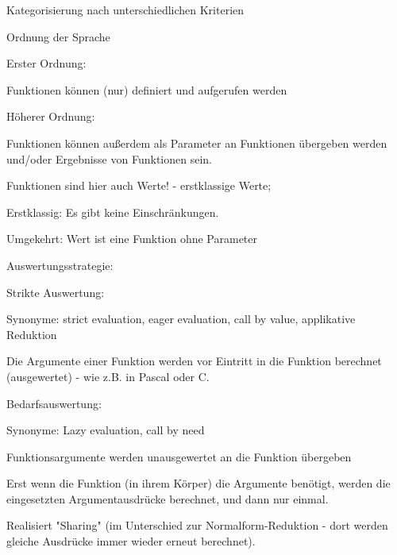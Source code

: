 \documentclass[10pt]{article}
\begin{document}
\begin{itemize*}
  \item Kategorisierung nach unterschiedlichen Kriterien
  \item Ordnung der Sprache
  \begin{itemize*}
    \item Erster Ordnung:
    \begin{itemize*}
      \item Funktionen können (nur) definiert und aufgerufen werden
    \end{itemize*}
    \item Höherer Ordnung:
    \begin{itemize*}
      \item Funktionen können außerdem als Parameter an Funktionen übergeben werden und/oder Ergebnisse von Funktionen sein.
      \item Funktionen sind hier auch Werte! - erstklassige Werte;
      \item Erstklassig: Es gibt keine Einschränkungen.
      \item Umgekehrt: Wert ist eine Funktion ohne Parameter
    \end{itemize*}
  \end{itemize*}
  \item Auswertungsstrategie:
  \begin{itemize*}
    \item Strikte Auswertung:
    \begin{itemize*}
      \item Synonyme: strict evaluation, eager evaluation, call by value, applikative Reduktion
      \item Die Argumente einer Funktion werden vor Eintritt in die Funktion berechnet (ausgewertet) - wie z.B. in Pascal oder C.
    \end{itemize*}
    \item Bedarfsauswertung:
    \begin{itemize*}
      \item Synonyme: Lazy evaluation, call by need
      \item Funktionsargumente werden unausgewertet an die Funktion übergeben
      \item Erst wenn die Funktion (in ihrem Körper) die Argumente benötigt, werden die eingesetzten Argumentausdrücke berechnet, und dann nur einmal.
      \item Realisiert "Sharing" (im Unterschied zur Normalform-Reduktion - dort werden gleiche Ausdrücke immer wieder erneut berechnet).

\end{itemize*}
\end{itemize*}
\end{itemize*}
\end{document}
